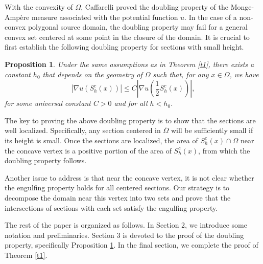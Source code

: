\documentclass[11pt]{amsart}
\theoremstyle{plain}
\newtheorem{proposition}{Proposition}[section]
\newtheorem{remark}{Remark}[section]
\newcommand{\0}{\textbf{0}}
\numberwithin{equation}{section}
\numberwithin{equation}{section}
\numberwithin{figure}{section}
\begin{document}
	
	
	
	With the convexity of \(\Omega\), Caffarelli proved the doubling property of the Monge-Ampère measure associated with the potential function \(u\). In the case of a non-convex polygonal source domain, the doubling property may fail for a general convex set centered at some point in the closure of the domain. It is crucial to first establish the following doubling property for sections with small height.
	\begin{proposition}\label{doubling property}
		Under the same assumptions as in Theorem \ref{t1}, there exists a constant $h_0$ that depends on the geometry of $\Omega$ such that, for any $x \in \Omega$, we have
		$$|\nabla u(S^c_h(x))| \leq C |\nabla u\left(\frac{1}{2} S^c_h(x)\right)|,$$
		for some universal constant $C > 0$ and for all $h < h_0$.
	\end{proposition}
	
	
	
	The key to proving the above doubling property is to show that the sections are well localized. Specifically, any section centered in $\overline{\Omega}$ will be sufficiently small if its height is small. Once the sections are localized, the area of $S^c_h(x) \cap \Omega$ near the concave vertex is a positive portion of the area of $S^c_h(x)$, from which the doubling property follows.  
	
	Another issue to address is that near the concave vertex, it is not clear whether the engulfing property holds for all centered sections. Our strategy is to decompose the domain near this vertex into two sets and prove that the intersections of sections with each set satisfy the engulfing property.  
	
	The rest of the paper is organized as follows. In Section 2, we introduce some notation and preliminaries. Section 3 is devoted to the proof of the doubling property, specifically Proposition \ref{doubling property}. In the final section, we complete the proof of Theorem \ref{t1}.
	
\end{document}
